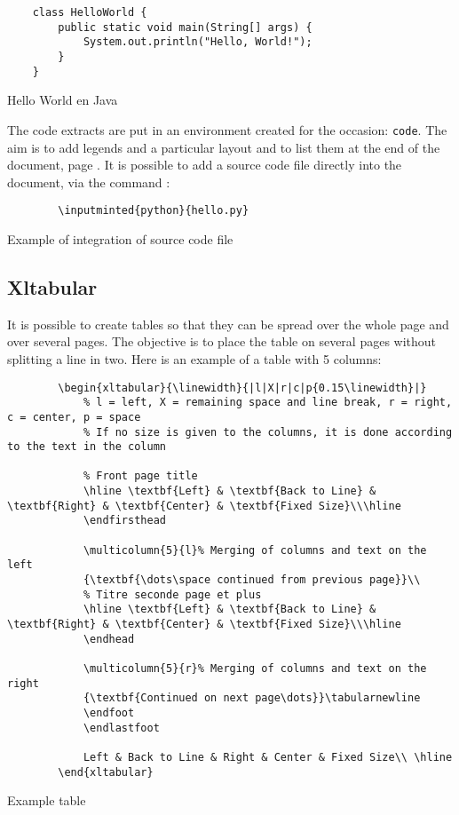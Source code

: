 \begin{code}
    \begin{verbatim}
    class HelloWorld {
        public static void main(String[] args) {
            System.out.println("Hello, World!");
        }
    }
\end{verbatim}
    \caption{Hello World en Java}
\end{code}

The code extracts are put in an environment created for the occasion: \texttt{code}.
The aim is to add legends and a particular layout and to list them at the end of the document,
page \pageref{TableOfCode}.
It is possible to add a source code file directly into the document, via the command :
\begin{code}
    \begin{verbatim}
        \inputminted{python}{hello.py}
\end{verbatim}
    \caption{Example of integration of source code file}
\end{code}

\subsection{Xltabular} \label{Xltabular}
It is possible to create tables so that they can be spread over the whole page and over several
pages. The objective is to place the table on several pages without splitting a line in two.
Here is an example of a table with 5 columns:
\begin{code}
    \begin{verbatim}
        \begin{xltabular}{\linewidth}{|l|X|r|c|p{0.15\linewidth}|}
            % l = left, X = remaining space and line break, r = right, c = center, p = space
            % If no size is given to the columns, it is done according to the text in the column

            % Front page title
            \hline \textbf{Left} & \textbf{Back to Line} & \textbf{Right} & \textbf{Center} & \textbf{Fixed Size}\\\hline
            \endfirsthead

            \multicolumn{5}{l}% Merging of columns and text on the left
            {\textbf{\dots\space continued from previous page}}\\
            % Titre seconde page et plus
            \hline \textbf{Left} & \textbf{Back to Line} & \textbf{Right} & \textbf{Center} & \textbf{Fixed Size}\\\hline
            \endhead

            \multicolumn{5}{r}% Merging of columns and text on the right
            {\textbf{Continued on next page\dots}}\tabularnewline
            \endfoot
            \endlastfoot

            Left & Back to Line & Right & Center & Fixed Size\\ \hline
        \end{xltabular}
\end{verbatim}
    \caption{Example table}
\end{code}

